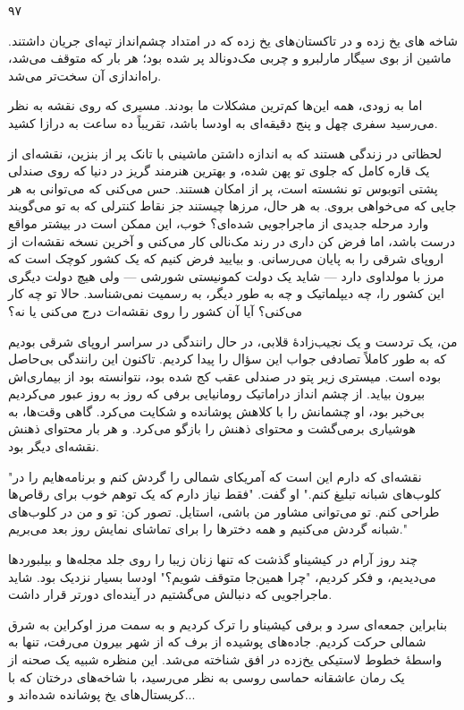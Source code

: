 

۹۷

شاخه های یخ زده و در تاکستان‌های یخ زده که در امتداد چشم‌انداز تپه‌ای جریان داشتند. ماشین از بوی سیگار مارلبرو و چربی مک‌دونالد پر شده بود؛ هر بار که متوقف می‌شد، راه‌اندازی آن سخت‌تر می‌شد.

اما به زودی، همه این‌ها کم‌ترین مشکلات ما بودند. مسیری که روی نقشه به نظر می‌رسید سفری چهل و پنج دقیقه‌ای به اودسا باشد، تقریباً ده ساعت به درازا کشید.

لحظاتی در زندگی هستند که به اندازه داشتن ماشینی با تانک پر از بنزین، نقشه‌ای از یک قاره کامل که جلوی تو پهن شده، و بهترین هنرمند گریز در دنیا که روی صندلی پشتی اتوبوس تو نشسته است، پر از امکان هستند. حس می‌کنی که می‌توانی به هر جایی که می‌خواهی بروی. به هر حال، مرزها چیستند جز نقاط کنترلی که به تو می‌گویند وارد مرحله جدیدی از ماجراجویی شده‌ای؟ خوب، این ممکن است در بیشتر مواقع درست باشد، اما فرض کن داری در رند مک‌نالی کار می‌کنی و آخرین نسخه نقشه‌ات از اروپای شرقی را به پایان می‌رسانی. و بیایید فرض کنیم که یک کشور کوچک است که مرز با مولداوی دارد — شاید یک دولت کمونیستی شورشی — ولی هیچ دولت دیگری این کشور را، چه دیپلماتیک و چه به طور دیگر، به رسمیت نمی‌شناسد. حالا تو چه کار می‌کنی؟ آیا آن کشور را روی نقشه‌ات درج می‌کنی یا نه؟

من، یک تردست و یک نجیب‌زادهٔ قلابی، در حال رانندگی در سراسر اروپای شرقی بودیم که به طور کاملاً تصادفی جواب این سؤال را پیدا کردیم. تاکنون این رانندگی بی‌حاصل بوده است. میستری زیر پتو در صندلی عقب کج شده بود، نتوانسته بود از بیماری‌اش بیرون بیاید. از چشم انداز دراماتیک رومانیایی برفی که روز به روز عبور می‌کردیم بی‌خبر بود، او چشمانش را با کلاهش پوشانده و شکایت می‌کرد. گاهی وقت‌ها، به هوشیاری برمی‌گشت و محتوای ذهنش را بازگو می‌کرد. و هر بار محتوای ذهنش نقشه‌ای دیگر بود.

"نقشه‌ای که دارم این است که آمریکای شمالی را گردش کنم و برنامه‌هایم را در کلوب‌های شبانه تبلیغ کنم." او گفت. "فقط نیاز دارم که یک توهم خوب برای رقاص‌ها طراحی کنم. تو می‌توانی مشاور من باشی، استایل. تصور کن: تو و من در کلوب‌های شبانه گردش می‌کنیم و همه دخترها را برای تماشای نمایش روز بعد می‌بریم."

چند روز آرام در کیشیناو گذشت که تنها زنان زیبا را روی جلد مجله‌ها و بیلبوردها می‌دیدیم، و فکر کردیم، "چرا همین‌جا متوقف شویم؟" اودسا بسیار نزدیک بود. شاید ماجراجویی که دنبالش می‌گشتیم در آینده‌ای دورتر قرار داشت.

بنابراین جمعه‌ای سرد و برفی کیشیناو را ترک کردیم و به سمت مرز اوکراین به شرق شمالی حرکت کردیم. جاده‌های پوشیده از برف که از شهر بیرون می‌رفت، تنها به واسطهٔ خطوط لاستیکی یخ‌زده در افق شناخته می‌شد. این منظره شبیه یک صحنه از یک رمان عاشقانه حماسی روسی به نظر می‌رسید، با شاخه‌های درختان که با کریستال‌های یخ پوشانده شده‌اند و... 

